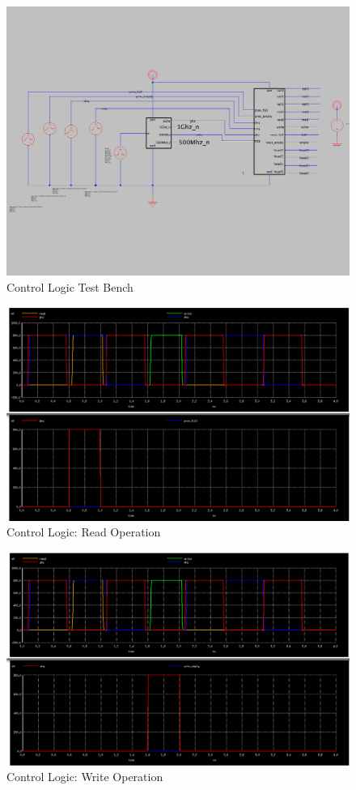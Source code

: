 \documentclass[a4paper]{article}
\begin{document}
\begin{figure}[H]
	\centering
	\includegraphics[scale=0.26]{controlLogicTest}
	\caption{Control Logic Test Bench}
	\label{fig:controlLogicTest}
\end{figure}

\begin{figure}[H]
	\centering
	\includegraphics[scale=0.3]{controlRead}
	\caption{Control Logic: Read Operation}
	\label{fig:controlRead}
\end{figure}

\begin{figure}[H]
	\centering
	\includegraphics[scale=0.3]{controlWrite}
	\caption{Control Logic: Write Operation}
	\label{fig:controlWrite}
\end{figure}
\end{document}
